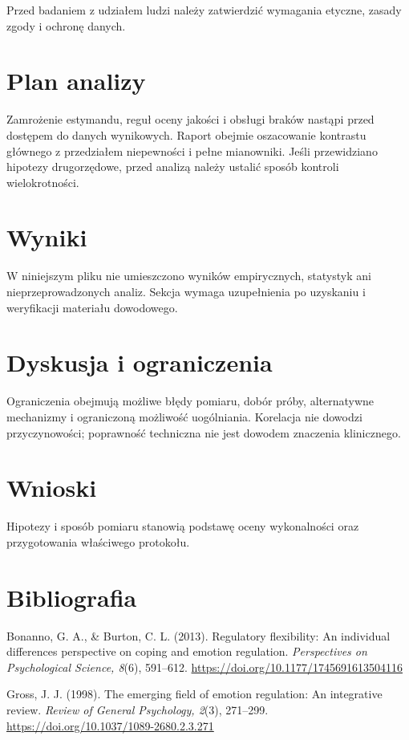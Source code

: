 \documentclass[11pt,a4paper]{article}
\begin{document}
Przed badaniem z udziałem ludzi należy zatwierdzić wymagania etyczne, zasady zgody i ochronę danych.

\section{Plan analizy}

Zamrożenie estymandu, reguł oceny jakości i obsługi braków nastąpi przed dostępem do danych wynikowych. Raport obejmie oszacowanie kontrastu głównego z przedziałem niepewności i pełne mianowniki. Jeśli przewidziano hipotezy drugorzędowe, przed analizą należy ustalić sposób kontroli wielokrotności.

\section{Wyniki}

W niniejszym pliku nie umieszczono wyników empirycznych, statystyk ani nieprzeprowadzonych analiz. Sekcja wymaga uzupełnienia po uzyskaniu i weryfikacji materiału dowodowego.

\section{Dyskusja i ograniczenia}

Ograniczenia obejmują możliwe błędy pomiaru, dobór próby, alternatywne mechanizmy i ograniczoną możliwość uogólniania. Korelacja nie dowodzi przyczynowości; poprawność techniczna nie jest dowodem znaczenia klinicznego.

\section{Wnioski}

Hipotezy i sposób pomiaru stanowią podstawę oceny wykonalności oraz przygotowania właściwego protokołu.

\section*{Bibliografia}

{\setlength{\parindent}{0pt}
\setlength{\parskip}{5pt}
\hangindent=1.27cm
Bonanno, G. A., \& Burton, C. L. (2013). Regulatory flexibility: An individual differences perspective on coping and emotion regulation. \textit{Perspectives on Psychological Science, 8}(6), 591--612. \url{https://doi.org/10.1177/1745691613504116}\par
\hangindent=1.27cm
Gross, J. J. (1998). The emerging field of emotion regulation: An integrative review. \textit{Review of General Psychology, 2}(3), 271--299. \url{https://doi.org/10.1037/1089-2680.2.3.271}\par
}
\end{document}
